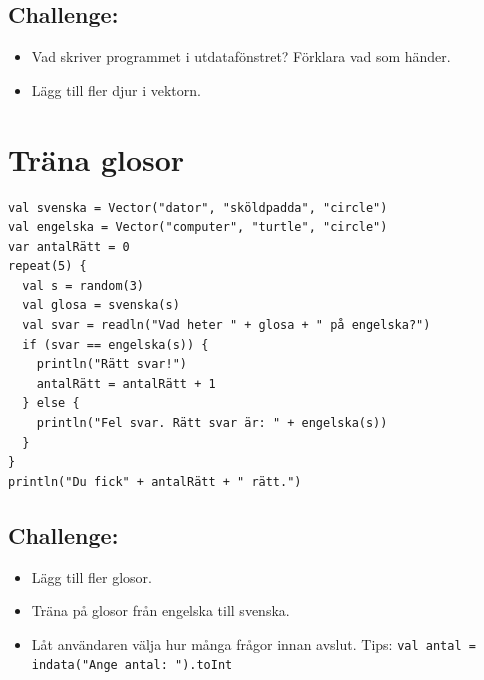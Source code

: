 \section*{\color{BrickRed}Challenge:}


\begin{itemize}

\item {Vad skriver programmet i utdatafönstret? Förklara vad som händer.}
\item {Lägg till fler djur i vektorn.}

\end{itemize}


\chapter{Träna glosor}
\begin{lstlisting}[basicstyle={\ttfamily\fontsize{14}{17}\selectfont},numbers=none]
val svenska = Vector("dator", "sköldpadda", "circle")
val engelska = Vector("computer", "turtle", "circle")
var antalRätt = 0
repeat(5) {
  val s = random(3)
  val glosa = svenska(s)
  val svar = readln("Vad heter " + glosa + " på engelska?")
  if (svar == engelska(s)) {
    println("Rätt svar!")
    antalRätt = antalRätt + 1
  } else {
    println("Fel svar. Rätt svar är: " + engelska(s))
  }
}
println("Du fick" + antalRätt + " rätt.")
\end{lstlisting}
        
\section*{\color{BrickRed}Challenge:}


\begin{itemize}

\item {Lägg till fler glosor.}
\item {Träna på glosor från engelska till svenska.}
\item {Låt användaren välja hur många frågor innan avslut. Tips: \lstinline{val antal = indata("Ange antal: ").toInt}}

\end{itemize}


